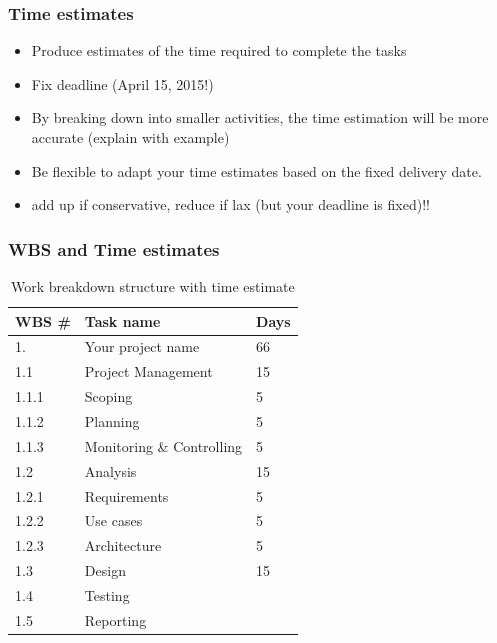 \documentclass{beamer}
\begin{document}
\begin{frame}[t]\frametitle{Time estimates}
    \begin{itemize}
        \item Produce estimates of the time required to complete the tasks
        \item Fix deadline (April 15, 2015!)
        \item By breaking down into smaller activities, the time estimation will be more accurate (explain with example)
        \item Be flexible to adapt your time estimates based on the fixed delivery date.
        \item add up if conservative, reduce if lax (but your deadline is fixed)!!
    \end{itemize}
\end{frame}

\begin{frame}[t]\frametitle{WBS and Time estimates}
\begin{table}[htb!]
    \caption{Work breakdown structure with time estimate}
    \label{tab:wbs}
    \begin{center}
        \begin{tabular}{p{2cm}|l|l}
        \textbf{WBS \#} & \textbf{Task name} & \textbf{Days} \\
        \hline

        \hline
        1. & Your project name & 66\\
        \hline

        \hline
        1.1 & Project Management & 15 \\
        1.1.1 & Scoping & 5\\
        1.1.2 & Planning & 5\\
        1.1.3 & Monitoring \& Controlling & 5\\
        \hline
        1.2 & Analysis & 15 \\
        1.2.1 & Requirements & 5 \\
        1.2.2 & Use cases & 5 \\
        1.2.3 & Architecture & 5 \\
        \hline
        1.3 & Design & 15\\
        \hline
        1.4 & Testing & \\
        \hline
        1.5 & Reporting & \\
        \hline

        \hline
        \end{tabular}
    \end{center}
\end{table}
\end{frame}
\end{document}

